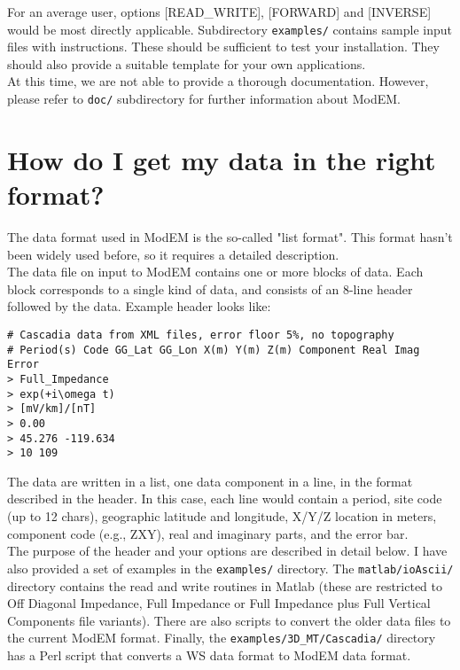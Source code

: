 \documentclass[12pt]{article}
\begin{document}
For an average user, options [READ\_WRITE], [FORWARD] and [INVERSE] would be most directly applicable.
Subdirectory \verb"examples/" contains sample input files with instructions.
These should be sufficient to test your installation. They should also provide a suitable template for your own applications.\\

At this time, we are not able to provide a thorough documentation. However,
please refer to \verb"doc/" subdirectory for further information about ModEM.


\section{How do I get my data in the right format?}

The data format used in ModEM is the so-called "list format". This format hasn't been widely used before, so it requires a detailed description.\\

The data file on input to ModEM contains one or more blocks of data. Each block corresponds to a single kind of data, and consists of an 8-line header followed by the data. Example header looks like:
\begin{verbatim}
# Cascadia data from XML files, error floor 5%, no topography
# Period(s) Code GG_Lat GG_Lon X(m) Y(m) Z(m) Component Real Imag Error
> Full_Impedance
> exp(+i\omega t)
> [mV/km]/[nT]
> 0.00
> 45.276 -119.634
> 10 109
\end{verbatim}

The data are written in a list, one data component in a line, in the format described in the header. In this case, each line would contain a period, site code (up to 12 chars), geographic latitude and longitude, X/Y/Z location in meters, component code (e.g., ZXY), real and imaginary parts, and the error bar.\\

The purpose of the header and your options are described in detail below. I have also provided a set of examples in the \verb"examples/" directory. The \verb"matlab/ioAscii/" directory contains the read and write routines in Matlab (these are restricted to Off Diagonal Impedance, Full Impedance or Full Impedance plus Full Vertical Components file variants). There are also scripts to convert the older data files to the current ModEM format. Finally, the \verb"examples/3D_MT/Cascadia/" directory has a Perl script that converts a WS data format to ModEM data format.
\end{document}
